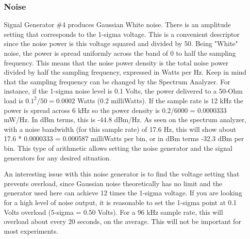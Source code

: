 \subsubsection{Noise}
\label{subsect:ASGNoise}
Signal  Generator \#4 produces Gaussian White noise.  There is an amplitude setting that corresponds to the 1-sigma voltage.  This is a convenient descriptor since the noise power is this voltage squared and divided by 50.  Being "White" noise, the power is spread uniformly across the band  of 0 to half the sampling frequency.  This means that the noise power density is the total noise power divided by half the sampling frequency,  expressed in Watts per Hz.  Keep in mind that the sampling frequency can be changed by the Spectrum Analyzer.
 For instance, if the 1-sigma noise level is 0.1 Volts, the power delivered to a 50-Ohm load is $0.1^2/50 = 0.0002$ Watts (0.2 milliWatts).   If the sample rate is 12 kHz the power is spread across 6 kHz so the power density is 0.2/6000 = 0.0000333 mW/Hz.  In dBm terms, this is -44.8 dBm/Hz.  As seen on the spectrum analyzer, with a noise bandwidth (for this sample rate) of 17.6 Hz, this will show about 17.6 * 0.0000333 = 0.000587 milliWatts per bin, or in dBm terms -32.3 dBm per bin.   This type of arithmetic allows setting the noise generator and the signal generators for any desired situation.

An interesting issue with this noise generator is to find the voltage setting that prevents overload, since Gaussian noise theoretically has no limit and the generator used here can achieve 12 times the 1-sigma voltage.  If you are looking for a high level of noise output, it is reasonable to set the 1-sigma point at 0.1 Volts overload (5-sigma = 0.50 Volts). For a 96 kHz sample rate, this will overload about every 20 seconds, on the average.  This will not be important for most experiments.
